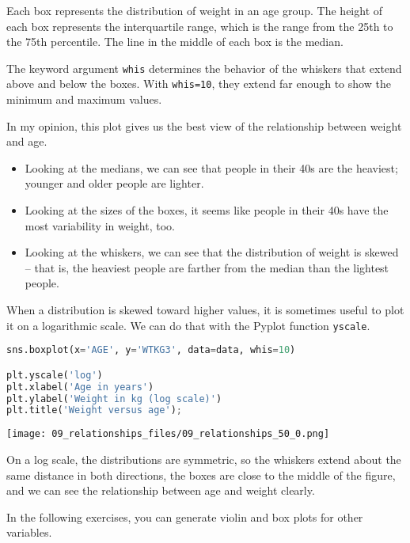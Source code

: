 Each box represents the distribution of weight in an age group. The
height of each box represents the interquartile range, which is the
range from the 25th to the 75th percentile. The line in the middle of
each box is the median.

The keyword argument \passthrough{\lstinline!whis!} determines the
behavior of the whiskers that extend above and below the boxes. With
\passthrough{\lstinline!whis=10!}, they extend far enough to show the
minimum and maximum values.

In my opinion, this plot gives us the best view of the relationship
between weight and age.

\begin{itemize}
\item
  Looking at the medians, we can see that people in their 40s are the
  heaviest; younger and older people are lighter.
\item
  Looking at the sizes of the boxes, it seems like people in their 40s
  have the most variability in weight, too.
\item
  Looking at the whiskers, we can see that the distribution of weight is
  skewed -- that is, the heaviest people are farther from the median
  than the lightest people.
\end{itemize}

When a distribution is skewed toward higher values, it is sometimes
useful to plot it on a logarithmic scale. We can do that with the Pyplot
function \passthrough{\lstinline!yscale!}.

\begin{lstlisting}[language=Python,style=source]
sns.boxplot(x='AGE', y='WTKG3', data=data, whis=10)

plt.yscale('log')
plt.xlabel('Age in years')
plt.ylabel('Weight in kg (log scale)')
plt.title('Weight versus age');
\end{lstlisting}

\begin{center}
\texttt{[image: 09\_relationships\_files/09\_relationships\_50\_0.png]}
\end{center}

On a log scale, the distributions are symmetric, so the whiskers extend
about the same distance in both directions, the boxes are close to the
middle of the figure, and we can see the relationship between age and
weight clearly.

In the following exercises, you can generate violin and box plots for
other variables.

